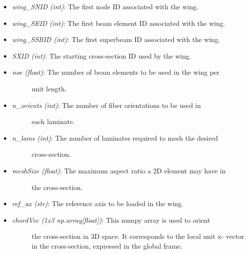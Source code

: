 \documentclass[letterpaper,10pt,english]{sphinxmanual}
\begin{document}
\begin{fulllineitems}
\begin{fulllineitems}
\begin{itemize}
\begin{description}
\end{description}

\item {} 
\emph{wing\_SNID (int)}: The first node ID associated with the wing.

\item {} 
\emph{wing\_SEID (int)}: The first beam element ID associated with the wing.

\item {} 
\emph{wing\_SSBID (int)}: The first superbeam ID associated with the wing.

\item {} 
\emph{SXID (int)}: The starting cross-section ID used by the wing.

\item {} \begin{description}
\item[{\emph{noe (float)}: The number of beam elements to be used in the wing per}] \leavevmode
unit length.

\end{description}

\item {} \begin{description}
\item[{\emph{n\_orients (int)}: The number of fiber orientations to be used in}] \leavevmode
each laminate.

\end{description}

\item {} \begin{description}
\item[{\emph{n\_lams (int)}: The number of laminates required to mesh the desired}] \leavevmode
cross-section.

\end{description}

\item {} \begin{description}
\item[{\emph{meshSize (float)}: The maximum aspect ratio a 2D element may have in}] \leavevmode
the cross-section.

\end{description}

\item {} 
\emph{ref\_ax (str)}: The reference axis to be loaded in the wing.

\item {} \begin{description}
\item[{\emph{chordVec (1x3 np.array{[}float{]})}: This numpy array is used to orient}] \leavevmode
the cross-section in 3D space. It corresponds to the local unit x-
vector in the cross-section, expressed in the global frame.


\end{description}
\end{itemize}
\end{fulllineitems}
\end{fulllineitems}
\end{document}
